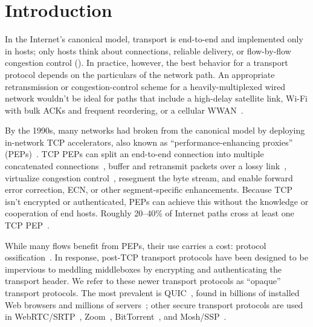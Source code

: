 \section{Introduction}
\label{sec:sidekick:intro}

In the Internet's canonical model, transport is end-to-end and implemented only
in hosts; only hosts think about connections, reliable delivery, or
flow-by-flow congestion control ().
In practice, however, the best behavior for a
transport protocol depends on the particulars of the network path. An
appropriate retransmission or congestion-control scheme for a
heavily-multiplexed wired network wouldn't be ideal for paths that include a
high-delay satellite link, Wi-Fi with bulk ACKs and frequent reordering, or a
cellular WWAN~\cite{kuhn2021quic-over-sat,goyal2017abc}.

By the 1990s, many networks had broken from the canonical model by deploying
in-network TCP accelerators, also known as ``performance-enhancing proxies''
(PEPs)~\cite{rfc3135}. TCP PEPs can split an end-to-end connection into
multiple concatenated connections~\cite
{kapoor2005achieving,caini2006pepsal,davern2011httpep,farkas2012splittcp,hayes2019mmwave},
buffer and retransmit packets over a lossy link~\cite
{balakrishnan1995snoop,polese2017milliproxy}, virtualize congestion
control~\cite{cronkite2016vcc,he2016acdc,mihaly2012mobilePEP}, resegment the
byte stream, and enable forward error correction, ECN,
or other segment-specific enhancements. Because TCP isn't
encrypted or authenticated, PEPs can achieve this without the
knowledge or cooperation of end hosts. Roughly 20--40\% of Internet paths cross
at least one TCP PEP~\cite{honda2011still, edeline2019bottomup}.

While many flows benefit from PEPs, their use carries a cost: protocol
ossification~\cite{papastergiou2017deossifying, edeline2019bottomup}.
In response,
post-TCP transport protocols have been designed to be impervious to
meddling middleboxes by encrypting and authenticating the transport header. We
refer to these newer transport protocols as ``opaque'' transport protocols. The
most prevalent is QUIC~\cite{rfc9000}, found in billions of installed Web
browsers and millions of servers~\cite{zirngibl2021quicdeployment}; other secure
transport protocols are used in WebRTC/SRTP~\cite{rfc8834webrtc},
Zoom~\cite{zoom}, BitTorrent~\cite{bittorrent}, and
Mosh/SSP~\cite{winstein2012mosh}.

